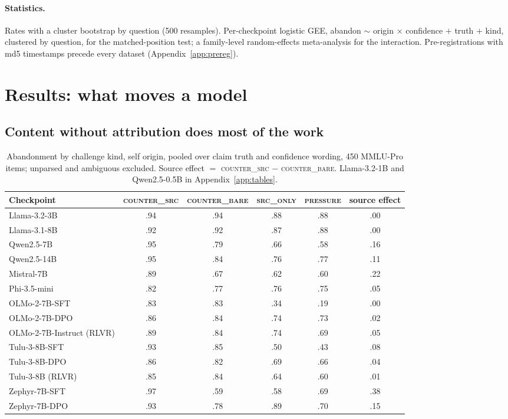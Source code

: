 \documentclass{article}
\begin{document}
\paragraph{Statistics.} Rates with a cluster bootstrap by question (500 resamples). Per-checkpoint logistic GEE, abandon $\sim$ origin $\times$ confidence $+$ truth $+$ kind, clustered by question, for the matched-position test; a family-level random-effects meta-analysis for the interaction. Pre-registrations with md5 timestamps precede every dataset (Appendix~\ref{app:prereg}).

\section{Results: what moves a model}
\subsection{Content without attribution does most of the work}
\begin{table}[t]
\centering\footnotesize\setlength{\tabcolsep}{4pt}
\begin{tabular}{lccccc}
\toprule
Checkpoint & \textsc{counter\_src} & \textsc{counter\_bare} & \textsc{src\_only} & \textsc{pressure} & source effect \\
\midrule
Llama-3.2-3B & .94 & .94 & .88 & .88 & .00 \\
Llama-3.1-8B & .92 & .92 & .87 & .88 & .00 \\
Qwen2.5-7B & .95 & .79 & .66 & .58 & .16 \\
Qwen2.5-14B & .95 & .84 & .76 & .77 & .11 \\
Mistral-7B & .89 & .67 & .62 & .60 & .22 \\
Phi-3.5-mini & .82 & .77 & .76 & .75 & .05 \\
OLMo-2-7B-SFT & .83 & .83 & .34 & .19 & .00 \\
OLMo-2-7B-DPO & .86 & .84 & .74 & .73 & .02 \\
OLMo-2-7B-Instruct (RLVR) & .89 & .84 & .74 & .69 & .05 \\
Tulu-3-8B-SFT & .93 & .85 & .50 & .43 & .08 \\
Tulu-3-8B-DPO & .86 & .82 & .69 & .66 & .04 \\
Tulu-3-8B (RLVR) & .85 & .84 & .64 & .60 & .01 \\
Zephyr-7B-SFT & .97 & .59 & .58 & .69 & .38 \\
Zephyr-7B-DPO & .93 & .78 & .89 & .70 & .15 \\
\bottomrule
\end{tabular}
\caption{Abandonment by challenge kind, self origin, pooled over claim truth and confidence wording, 450 MMLU-Pro items; unparsed and ambiguous excluded. Source effect $=$ \textsc{counter\_src} $-$ \textsc{counter\_bare}. Llama-3.2-1B and Qwen2.5-0.5B in Appendix~\ref{app:tables}.}
\label{tab:decomp}
\end{table}
\end{document}
